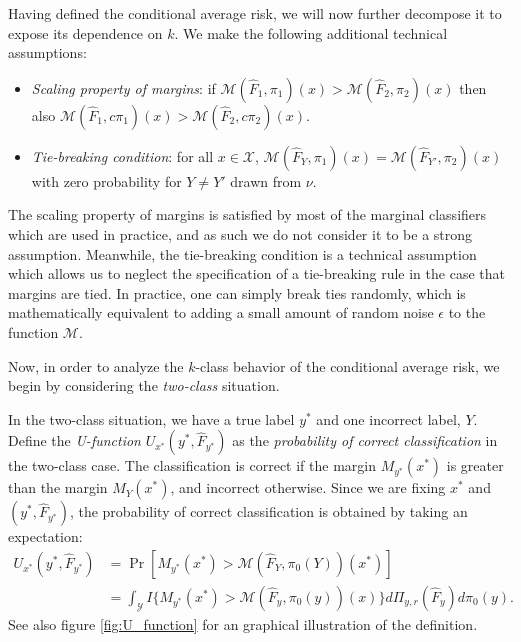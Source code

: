 \documentclass[12pt]{article}
\begin{document}
Having defined the conditional average risk, we will now further
decompose it to expose its dependence on $k$.
We make the following additional technical assumptions:
\begin{itemize}
\item 
\emph{Scaling property of margins}: if $\mathcal{M}(\hat{F}_1, \pi_1)(x) >
\mathcal{M}(\hat{F}_2, \pi_2)(x)$ then also $\mathcal{M}(\hat{F}_1,
c\pi_1)(x) > \mathcal{M}(\hat{F}_2, c\pi_2)(x)$.
\item 
\emph{Tie-breaking condition}: for all $x \in \mathcal{X}$,
$\mathcal{M}(\hat{F}_Y, \pi_1)(x) = \mathcal{M}(\hat{F}_{Y'}, \pi_2)(x)$
with zero probability for $Y \neq Y'$ drawn from $\nu$.
\end{itemize}
The scaling property of margins is satisfied by most of the marginal
classifiers which are used in practice, and as such we do not consider
it to be a strong assumption.  Meanwhile, the tie-breaking condition
is a technical assumption which allows us to neglect the specification
of a tie-breaking rule in the case that margins are tied.  In
practice, one can simply break ties randomly, which is mathematically
equivalent to adding a small amount of random noise $\epsilon$ to the
function $\mathcal{M}$.

Now, in order to analyze the $k$-class behavior of the conditional
average risk, we begin by considering the \emph{two-class} situation.

In the two-class situation, we have a true label $y^*$ and one
incorrect label, $Y$.  Define the \emph{U-function}
$U_{x^*}(y^*, \hat{F}_{y^*})$ as the \emph{probability of correct
classification} in the two-class case.
The classification is correct if the margin
$M_{y^*}(x^*)$ is greater than the margin $M_Y(x^*)$, and incorrect
otherwise.  
Since we are fixing $x^*$ and $(y^*, \hat{F}_{y^*})$, the
probability of correct classification is obtained by taking an expectation:
\begin{align}\label{eq:U_function}
U_{x^*}(y^*, \hat{F}_{y^*}) &= \Pr[M_{y^*}(x^*) > \mathcal{M}(\hat{F}_Y, \pi_0(Y))(x^*)]
\\&= \int_{\mathcal{Y}} 
I\{
M_{y^*}(x^*) > \mathcal{M}(\hat{F}_{y}, \pi_0(y))(x)
\}
d\Pi_{y, r}(\hat{F}_y)
d\pi_0(y).
\end{align}
See also figure \ref{fig:U_function} for an graphical illustration of
the definition.
\end{document}
